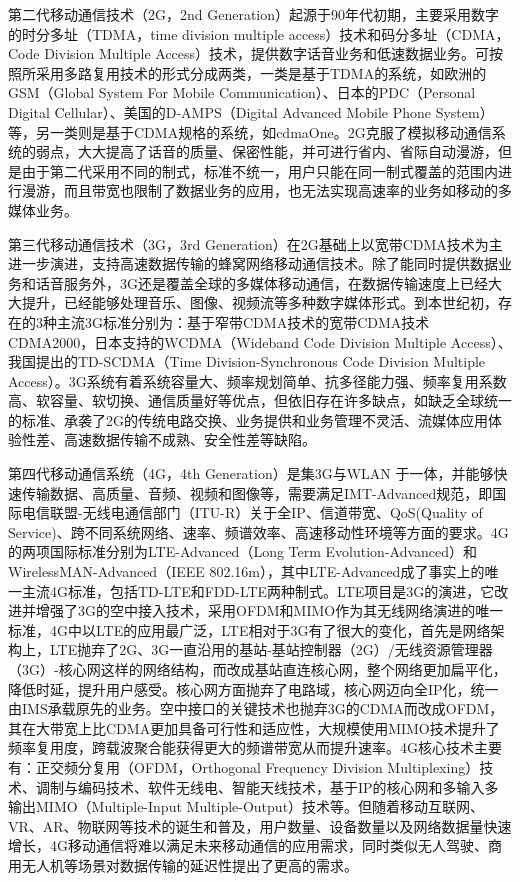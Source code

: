 \documentclass[figurelist,tablelist,algorithmlist,nomlist,masters]{seuthesix}
\begin{document}
	第二代移动通信技术（2G，2nd Generation）起源于90年代初期，主要采用数字的时分多址（TDMA，time division multiple access）技术和码分多址（CDMA，Code Division Multiple Access）技术，提供数字话音业务和低速数据业务。可按照所采用多路复用技术的形式分成两类，一类是基于TDMA的系统，如欧洲的GSM（Global System For Mobile Communication）、日本的PDC（Personal Digital Cellular）、美国的D-AMPS（Digital Advanced Mobile Phone System）等，另一类则是基于CDMA规格的系统，如cdmaOne。2G克服了模拟移动通信系统的弱点，大大提高了话音的质量、保密性能，并可进行省内、省际自动漫游，但是由于第二代采用不同的制式，标准不统一，用户只能在同一制式覆盖的范围内进行漫游，而且带宽也限制了数据业务的应用，也无法实现高速率的业务如移动的多媒体业务。

	第三代移动通信技术（3G，3rd Generation）在2G基础上以宽带CDMA技术为主进一步演进，支持高速数据传输的蜂窝网络移动通信技术。除了能同时提供数据业务和话音服务外，3G还是覆盖全球的多媒体移动通信，在数据传输速度上已经大大提升，已经能够处理音乐、图像、视频流等多种数字媒体形式。到本世纪初，存在的3种主流3G标准分别为：基于窄带CDMA技术的宽带CDMA技术CDMA2000，日本支持的WCDMA（Wideband Code Division Multiple Access）、我国提出的TD-SCDMA（Time Division-Synchronous Code Division Multiple Access）。3G系统有着系统容量大、频率规划简单、抗多径能力强、频率复用系数高、软容量、软切换、通信质量好等优点，但依旧存在许多缺点，如缺乏全球统一的标准、承袭了2G的传统电路交换、业务提供和业务管理不灵活、流媒体应用体验性差、高速数据传输不成熟、安全性差等缺陷。

	第四代移动通信系统（4G，4th Generation）是集3G与WLAN 于一体，并能够快速传输数据、高质量、音频、视频和图像等，需要满足IMT-Advanced规范，即国际电信联盟-无线电通信部门（ITU-R）关于全IP、信道带宽、QoS(Quality of Service)、跨不同系统网络、速率、频谱效率、高速移动性环境等方面的要求。4G的两项国际标准分别为LTE-Advanced（Long Term Evolution-Advanced）和WirelessMAN-Advanced（IEEE 802.16m），其中LTE-Advanced成了事实上的唯一主流4G标准，包括TD-LTE和FDD-LTE两种制式。LTE项目是3G的演进，它改进并增强了3G的空中接入技术，采用OFDM和MIMO作为其无线网络演进的唯一标准，4G中以LTE的应用最广泛，LTE相对于3G有了很大的变化，首先是网络架构上，LTE抛弃了2G、3G一直沿用的基站-基站控制器（2G）/无线资源管理器（3G）-核心网这样的网络结构，而改成基站直连核心网，整个网络更加扁平化，降低时延，提升用户感受。核心网方面抛弃了电路域，核心网迈向全IP化，统一由IMS承载原先的业务。空中接口的关键技术也抛弃3G的CDMA而改成OFDM，其在大带宽上比CDMA更加具备可行性和适应性，大规模使用MIMO技术提升了频率复用度，跨载波聚合能获得更大的频谱带宽从而提升速率。4G核心技术主要有：正交频分复用（OFDM，Orthogonal Frequency Division Multiplexing）技术、调制与编码技术、软件无线电、智能天线技术，基于IP的核心网和多输入多输出MIMO（Multiple-Input Multiple-Output）技术等。但随着移动互联网、VR、AR、物联网等技术的诞生和普及，用户数量、设备数量以及网络数据量快速增长，4G移动通信将难以满足未来移动通信的应用需求，同时类似无人驾驶、商用无人机等场景对数据传输的延迟性提出了更高的需求。
\end{document}
